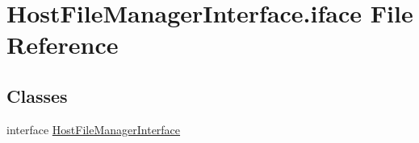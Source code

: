 \hypertarget{HostFileManagerInterface_8iface}{\section{Host\-File\-Manager\-Interface.\-iface File Reference}
\label{HostFileManagerInterface_8iface}
}
\subsection*{Classes}
\begin{DoxyCompactItemize}
\item 
interface \hyperlink{interfaceHostFileManagerInterface}{Host\-File\-Manager\-Interface}
\end{DoxyCompactItemize}
